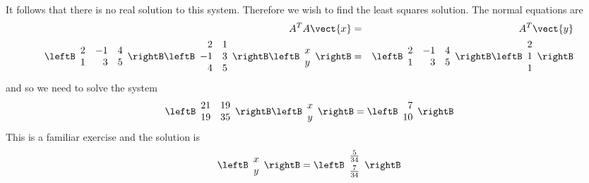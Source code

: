 \begin{solution}
It follows that there is no real solution to this system. Therefore we wish to find the least squares solution. The normal equations are 
\begin{eqnarray*}
A^T A \vect{x} &=& A^T \vect{y} \\
\leftB
\begin{array}{rrr}
2 & -1 & 4 \\ 
1 & 3 & 5
\end{array}
\rightB \leftB 
\begin{array}{rr}
2 & 1 \\ 
-1 & 3 \\ 
4 & 5
\end{array}
\rightB \leftB 
\begin{array}{c}
x \\ 
y
\end{array}
\rightB &=&\leftB 
\begin{array}{rrr}
2 & -1 & 4 \\ 
1 & 3 & 5
\end{array}
\rightB \leftB 
\begin{array}{c}
2 \\ 
1 \\ 
1
\end{array}
\rightB
\end{eqnarray*}
and so we need to solve the system 
\begin{equation*}
\leftB
\begin{array}{rr}
21 & 19 \\ 
19 & 35
\end{array}
\rightB \leftB 
\begin{array}{c}
x \\ 
y
\end{array}
\rightB =\leftB 
\begin{array}{r}
7 \\ 
10
\end{array}
\rightB
\end{equation*}
This is a familiar exercise and the solution is 
\begin{equation*}
\leftB
\begin{array}{c}
x \\ 
y
\end{array}
\rightB =\leftB
\begin{array}{c}
\vspace{0.05in}\frac{5}{34} \\ 
\vspace{0.05in}\frac{7}{34}
\end{array}
\rightB
\end{equation*}
\end{solution}

